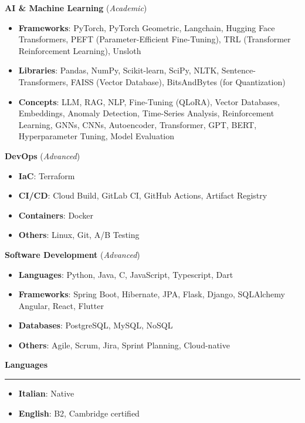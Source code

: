 \documentclass[9pt, a4paper]{article}
\newcommand{\cvsection}[1]{%
	\vspace{2pt}\par
	{\Large\bfseries\color{sectionblue}#1}\par
	\vspace{2pt}\hrule\vspace{6pt}
}
\begin{document}
\begin{minipage}[t]{0.3\linewidth}
		{\bfseries AI \& Machine Learning} (\textit{Academic})
		\begin{itemize}[leftmargin=*, nosep, itemsep=2pt]
			\footnotesize
			\item \textbf{Frameworks}: PyTorch, PyTorch Geometric, Langchain, Hugging Face Transformers, PEFT (Parameter-Efficient Fine-Tuning), TRL (Transformer Reinforcement Learning), Unsloth
			
			\item \textbf{Libraries}: Pandas, NumPy, Scikit-learn, SciPy, NLTK, Sentence-Transformers, FAISS (Vector Database), BitsAndBytes (for Quantization) 
			
			\item \textbf{Concepts}: LLM, RAG, NLP, Fine-Tuning (QLoRA), Vector Databases, Embeddings, Anomaly Detection, Time-Series Analysis, Reinforcement Learning, GNNs, CNNs, Autoencoder, Transformer, GPT, BERT, Hyperparameter Tuning, Model Evaluation
		\end{itemize}
		\vspace{4pt}
		
		{\bfseries DevOps} (\textit{Advanced})
		\begin{itemize}[leftmargin=*, nosep, itemsep=2pt]
			\footnotesize
			\item \textbf{IaC}: Terraform
			\item \textbf{CI/CD}: Cloud Build, GitLab CI, GitHub Actions, Artifact Registry
			\item \textbf{Containers}: Docker
			\item \textbf{Others}: Linux, Git, A/B Testing
		\end{itemize}
		\vspace{4pt}
		
		{\bfseries Software Development} (\textit{Advanced})
		\begin{itemize}[leftmargin=*, nosep, itemsep=2pt]
			\footnotesize
			\item \textbf{Languages}: Python, Java, C, JavaScript, Typescript, Dart
			\item \textbf{Frameworks}: Spring Boot, Hibernate, JPA, Flask, Django, SQLAlchemy Angular, React, Flutter
			\item \textbf{Databases}: PostgreSQL, MySQL, NoSQL
			\item \textbf{Others}: Agile, Scrum, Jira, Sprint Planning, Cloud-native
		\end{itemize}
		\vspace{7pt}
		
		\cvsection{Languages}
		\begin{itemize}[leftmargin=*, nosep, itemsep=2pt]
			\item \textbf{Italian}: Native
			\item \textbf{English}: B2, Cambridge certified
		\end{itemize}
		
	\end{minipage}
	
\end{document}
